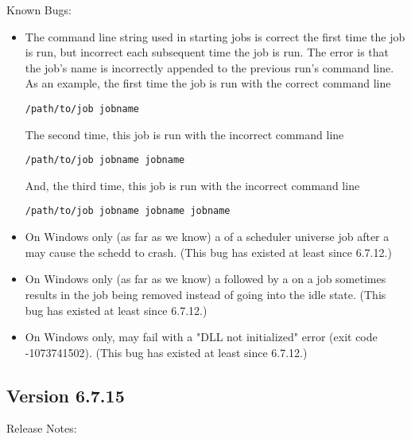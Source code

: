 \noindent Known Bugs:

\begin{itemize}

\item The command line string used in starting  jobs is correct
the first time the job is run,
but incorrect each subsequent time the job is run.
The error is that the job's name is incorrectly appended to the
previous run's command line.
As an example, the first time the job is run with the correct command line
\begin{verbatim}
/path/to/job jobname
\end{verbatim}
The second time, this job is run with the incorrect command line 
\begin{verbatim}
/path/to/job jobname jobname
\end{verbatim}
And, the third time, this job is run with the incorrect command line
\begin{verbatim}
/path/to/job jobname jobname jobname
\end{verbatim}

\item On Windows only (as far as we know) a  of a scheduler
universe job after a  may cause the schedd to crash.
(This bug has existed at least since 6.7.12.)

\item On Windows only (as far as we know) a  followed by a
 on a job sometimes results in the job being removed
instead of going into the idle state.  (This bug has existed at
least since 6.7.12.)

\item On Windows only,  may fail with a "DLL not
initialized" error (exit code -1073741502).  (This bug has existed at
least since 6.7.12.)

\end{itemize}

\subsection*{\label{sec:New-6-7.15}Version 6.7.15}

\noindent Release Notes:

